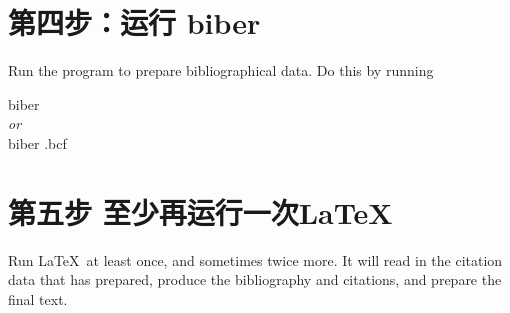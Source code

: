 \section{第四步：运行 biber}

Run the  program to prepare bibliographical data. Do
this by running
\begin{pseudoverb}
  \centering
  biber \\
  {\normalfont\itshape or} \\
  biber .bcf
\end{pseudoverb}

\section{第五步 至少再运行一次\LaTeX }

Run \LaTeX\ at least once, and sometimes twice more. It will read in
the citation data that  has prepared, produce the
bibliography and citations, and prepare the final text.


